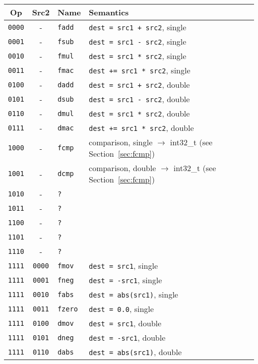 \documentclass[10pt,a4paper]{article}
\begin{document}
\begin{tabular}{ccll}
\toprule
Op & Src2 & Name & Semantics \\
\midrule
\texttt{0000} & - & \texttt{fadd} & \texttt{dest = src1 + src2}, single \\
\texttt{0001} & - & \texttt{fsub} & \texttt{dest = src1 - src2}, single \\
\texttt{0010} & - & \texttt{fmul} & \texttt{dest = src1 * src2}, single \\
\texttt{0011} & - & \texttt{fmac} & \texttt{dest += src1 * src2}, single \\
\texttt{0100} & - & \texttt{dadd} & \texttt{dest = src1 + src2}, double \\
\texttt{0101} & - & \texttt{dsub} & \texttt{dest = src1 - src2}, double \\
\texttt{0110} & - & \texttt{dmul} & \texttt{dest = src1 * src2}, double \\
\texttt{0111} & - & \texttt{dmac} & \texttt{dest += src1 * src2}, double \\
\texttt{1000} & - & \texttt{fcmp} & comparison, single $\rightarrow$ int32\_t (see Section~\ref{sec:fcmp}) \\
\texttt{1001} & - & \texttt{dcmp} & comparison, double $\rightarrow$ int32\_t (see Section~\ref{sec:fcmp}) \\
\texttt{1010} & - & \texttt{?} & \\
\texttt{1011} & - & \texttt{?} & \\
\texttt{1100} & - & \texttt{?} & \\
\texttt{1101} & - & \texttt{?} & \\
\texttt{1110} & - & \texttt{?} & \\
\texttt{1111} & \texttt{0000} & \texttt{fmov} & \texttt{dest = src1}, single \\
\texttt{1111} & \texttt{0001} & \texttt{fneg} & \texttt{dest = -src1}, single \\
\texttt{1111} & \texttt{0010} & \texttt{fabs} & \texttt{dest = abs(src1)}, single \\
\texttt{1111} & \texttt{0011} & \texttt{fzero} & \texttt{dest = 0.0}, single \\
\texttt{1111} & \texttt{0100} & \texttt{dmov} & \texttt{dest = src1}, double \\
\texttt{1111} & \texttt{0101} & \texttt{dneg} & \texttt{dest = -src1}, double \\
\texttt{1111} & \texttt{0110} & \texttt{dabs} & \texttt{dest = abs(src1)}, double \\

\end{tabular}
\end{document}
